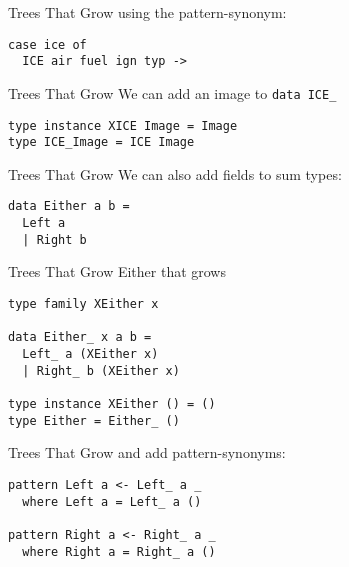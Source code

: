 \begin{frame}[fragile]
\begin{block}{Trees That Grow}
using the pattern-synonym:
\begin{lstlisting}[style=haskell]
case ice of
  ICE air fuel ign typ -> 
\end{lstlisting}
\end{block}
\end{frame}
 
\begin{frame}[fragile]
\begin{block}{Trees That Grow}
We can add an image to \lstinline{data ICE_}
\begin{lstlisting}[style=haskell]
type instance XICE Image = Image
type ICE_Image = ICE Image
\end{lstlisting}
\end{block}
\end{frame}

\begin{frame}[fragile]
\begin{block}{Trees That Grow}
We can also add fields to sum types:
\begin{lstlisting}[style=haskell]
data Either a b =
  Left a
  | Right b
\end{lstlisting}
\end{block}
\end{frame}

\begin{frame}[fragile]
\begin{block}{Trees That Grow}
Either that grows
\begin{lstlisting}[style=haskell]
type family XEither x

data Either_ x a b =
  Left_ a (XEither x)
  | Right_ b (XEither x)

type instance XEither () = ()
type Either = Either_ ()
\end{lstlisting}
\end{block}
\end{frame}

\begin{frame}[fragile]
\begin{block}{Trees That Grow}
and add pattern-synonyms:
\begin{lstlisting}[style=haskell]
pattern Left a <- Left_ a _
  where Left a = Left_ a ()

pattern Right a <- Right_ a _
  where Right a = Right_ a ()
\end{lstlisting}
\end{block}
\end{frame}
 
